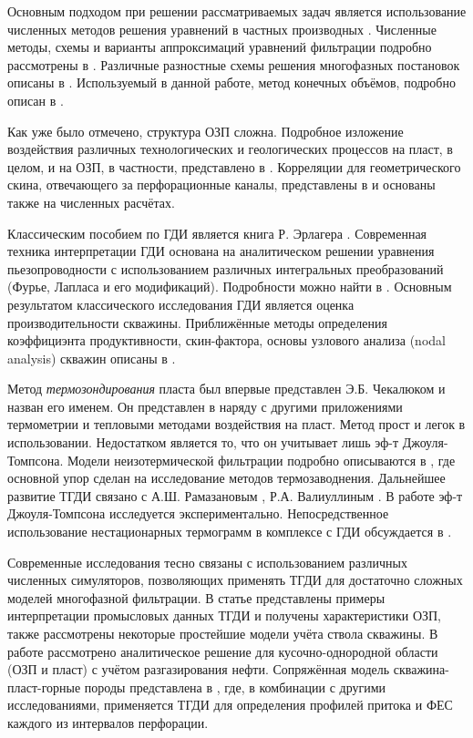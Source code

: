 	Основным подходом при решении рассматриваемых задач является использование численных методов решения уравнений в частных производных \cite{petrov}.
	Численные методы, схемы и варианты аппроксимаций уравнений фильтрации подробно рассмотрены в \cite{kanevskaya, aziz, chen}.
	Различные разностные схемы решения многофазных постановок описаны в \cite{keldysh}.
	Используемый в данной работе, метод конечных объёмов, подробно описан в \cite{leveque}.
	
	Как уже было отмечено, структура ОЗП сложна. Подробное изложение воздействия различных технологических и геологических процессов на пласт, в целом, и на ОЗП, в частности, представлено в \cite{civan}. Корреляции для геометрического скина, отвечающего за перфорационные каналы, представлены в \cite{tariq} и основаны также на численных расчётах.
	
	Классическим пособием по ГДИ является книга Р. Эрлагера \cite{erlauger}.
	Современная техника интерпретации ГДИ основана на аналитическом решении уравнения пьезопроводности с использованием различных интегральных преобразований (Фурье, Лапласа и его модификаций). Подробности можно найти в \cite{kappa}.
	Основным результатом классического исследования ГДИ является оценка производительности скважины. Приближённые методы определения коэффициэнта продуктивности, скин-фактора, основы узлового анализа (nodal analysis) скважин описаны в \cite{mukerdzhi}.
	
	
	Метод \textit{термозондирования} пласта был впервые представлен Э.Б. Чекалюком и назван его именем.
	Он представлен в \cite{checkalyuk} наряду с другими приложениями термометрии и тепловыми методами воздействия на пласт.
	Метод прост и легок в использовании. Недостатком является то, что он учитывает лишь эф-т Джоуля-Томпсона.
	Модели неизотермической фильтрации подробно описываются в \cite{alishaev}, где основной упор сделан на исследование методов термозаводнения.
	Дальнейшее развитие ТГДИ связано с А.Ш. Рамазановым \cite{ramazanov_diss}, Р.А. Валиуллиным \cite{valiullin}.
	В работе \cite{ramazanov_old1} эф-т Джоуля-Томпсона исследуется экспериментально.
	Непосредственное использование нестационарных термограмм в комплексе с ГДИ обсуждается в \cite{ramazanov_old2}.
	
	Современные исследования тесно связаны с использованием различных численных симуляторов, позволяющих применять ТГДИ для достаточно сложных моделей многофазной фильтрации. В статье \cite{ramazanov_spe} представлены примеры интерпретации промысловых данных ТГДИ и получены характеристики ОЗП, также рассмотрены некоторые простейшие модели учёта ствола скважины. 
	В работе \cite{ramazanov_main} рассмотрено аналитическое решение для кусочно-однородной области (ОЗП и пласт) с учётом разгазирования нефти.
	Сопряжённая модель скважина-пласт-горные породы представлена в \cite{ramazanov_spe1}, где, в комбинации с другими исследованиями, применяется ТГДИ для определения профилей притока и ФЕС каждого из интервалов перфорации.
	
